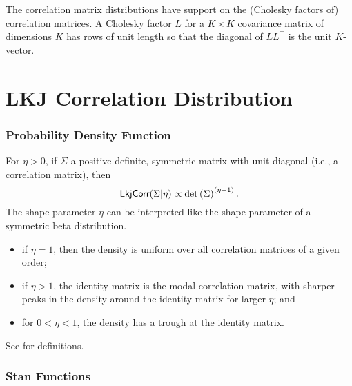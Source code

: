 \noindent
The correlation matrix distributions have support on the (Cholesky
factors of) correlation matrices.  A Cholesky factor $L$ for a $K
\times K$ covariance matrix of dimensions $K$ has rows of unit length
so that the diagonal of $L L^{\top}$ is the unit $K$-vector.


\section{LKJ Correlation Distribution}\label{lkj-correlation.section}

\subsubsection{Probability Density Function}

For $\eta > 0$, if $\Sigma$ a positive-definite, symmetric matrix with
unit diagonal (i.e., a correlation matrix), then
%
\[
\distro{LkjCorr}(\Sigma|\eta)
\propto \det \left( \Sigma \right)^{(\eta - 1)}.
\]
%
The shape parameter $\eta$ can be interpreted like the shape parameter
of a symmetric beta distribution. 
\begin{itemize}
\item if $\eta = 1$, then the density is uniform over all correlation
  matrices of a given order;
\item if $\eta > 1$, the identity matrix is the modal correlation
  matrix, with sharper peaks in the density around the identity matrix
  for larger $\eta$; and
\item for $0 < \eta < 1$, the density has a trough at the identity
  matrix.
\end{itemize}
See \citep{LewandowskiKurowickaJoe:2009} for definitions.


\subsubsection{Stan Functions}

\begin{description}
%
%
\end{description}
\begin{description}
\end{description}


